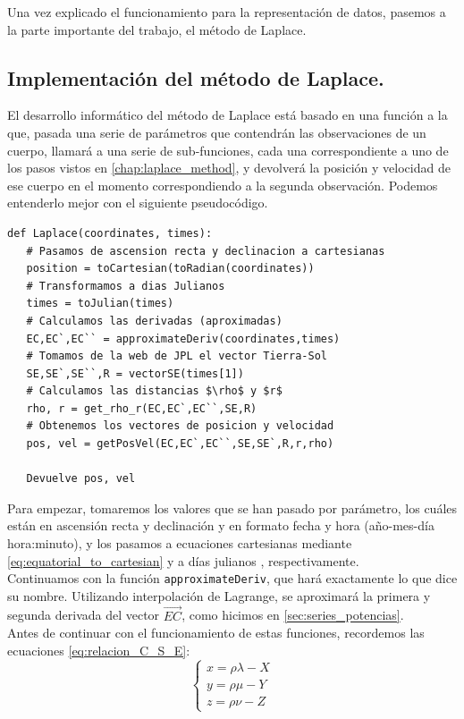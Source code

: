 \documentclass[11pt]{book}
\begin{document}
Una vez explicado el funcionamiento para la representación de datos, pasemos a la parte importante del trabajo, el método de Laplace.\\

\subsection{Implementación del método de Laplace.}
\label{subsec:laplace_method_code}
El desarrollo informático del método de Laplace está basado en una función a la que, pasada una serie de parámetros que contendrán las observaciones de un cuerpo, llamará a una serie de sub-funciones, cada una correspondiente a uno de los pasos vistos en \ref{chap:laplace_method}, y devolverá la posición y velocidad de ese cuerpo en el momento correspondiendo a la segunda observación. Podemos entenderlo mejor con el siguiente pseudocódigo.
\begin{lstlisting}[style=PythonCode]
def Laplace(coordinates, times):
   # Pasamos de ascension recta y declinacion a cartesianas
   position = toCartesian(toRadian(coordinates))
   # Transformamos a dias Julianos
   times = toJulian(times)
   # Calculamos las derivadas (aproximadas)
   EC,EC`,EC`` = approximateDeriv(coordinates,times)
   # Tomamos de la web de JPL el vector Tierra-Sol
   SE,SE`,SE``,R = vectorSE(times[1])
   # Calculamos las distancias $\rho$ y $r$
   rho, r = get_rho_r(EC,EC`,EC``,SE,R)
   # Obtenemos los vectores de posicion y velocidad
   pos, vel = getPosVel(EC,EC`,EC``,SE,SE`,R,r,rho)
   
   Devuelve pos, vel
\end{lstlisting}

Para empezar, tomaremos los valores que se han pasado por parámetro, los cuáles están en ascensión recta y declinación y en formato fecha y hora (año-mes-día hora:minuto), y los pasamos a ecuaciones cartesianas mediante \eqref{eq:equatorial_to_cartesian} y a días julianos \cite{julian}, respectivamente.\\

Continuamos con la función \texttt{approximateDeriv}, que hará exactamente lo que dice su nombre. Utilizando interpolación de Lagrange, se aproximará la primera y segunda derivada del vector $\overrightarrow{EC}$, como hicimos en \ref{sec:series_potencias}.\\

Antes de continuar con el funcionamiento de estas funciones, recordemos las ecuaciones \eqref{eq:relacion_C_S_E}:
\[
\left\{
\begin{array}{l}
	x=\rho\lambda-X\\
	y=\rho\mu-Y\\
	z=\rho\nu-Z
\end{array}
\right.
\]
\end{document}
